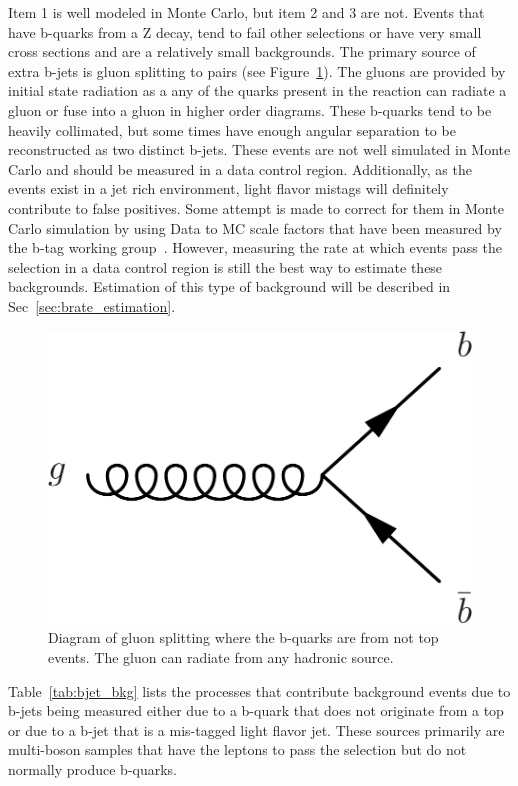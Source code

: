 Item 1 is well modeled in Monte Carlo, but item 2 and 3 are not. Events that have b-quarks from a Z decay, tend to fail other selections or have very small cross sections and are a relatively small backgrounds. The primary source of extra b-jets is gluon splitting to \bbbar pairs (see Figure~\ref{fig:gluon_splitting}). The gluons are provided by initial state radiation as a any of the quarks present in the reaction can radiate a gluon or fuse into a gluon in higher order diagrams. These b-quarks tend to be heavily collimated, but some times have enough angular separation to be reconstructed as two distinct b-jets. These events are not well simulated in Monte Carlo and should be measured in a data control region. Additionally, as the \ttZ events exist in a jet rich environment, light flavor mistags will definitely contribute to false positives. Some attempt is made to correct for them in Monte Carlo simulation by using Data to MC scale factors that have been measured by the b-tag working group~\cite{BTV11003}. However, measuring the rate at which events pass the selection in a data control region is still the best way to estimate these backgrounds. Estimation of this type of background will be described in Sec~\ref{sec:brate_estimation}. \\

			\begin{figure}[h]
\begin{center}
\includegraphics[width=0.48\linewidth]{Figs/gluon_splitting.pdf}
\caption{\label{fig:gluon_splitting}
Diagram of gluon splitting where the b-quarks are from not top events. The gluon can radiate from any hadronic source.
}
\end{center}
\end{figure} 


		Table~\ref{tab:bjet_bkg} lists the processes that contribute background events due to b-jets being measured either due to a b-quark that does not originate from a top or due to a b-jet that is a mis-tagged light flavor jet. These sources primarily are multi-boson samples that have the leptons to pass the selection but do not normally produce b-quarks.

